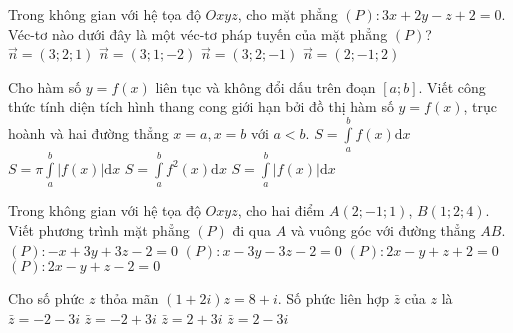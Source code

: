 \begin{ex}%
Trong không gian với hệ tọa độ $Oxyz$, cho mặt phẳng $(P)\colon 3x+2y-z+2=0$. Véc-tơ nào dưới đây là một véc-tơ pháp tuyến của mặt phẳng $(P)$?
\choice
{$\vec{n}=(3;2;1)$}
{$\vec{n}=(3;1;-2)$}
{\True $\vec{n}=(3;2;-1)$}
{$\vec{n}=(2;-1;2)$}
\end{ex}

\begin{ex}%
Cho hàm số $y=f(x)$ liên tục và không đổi dấu trên đoạn $\left[a; b\right]$. Viết công thức tính diện tích hình thang cong giới hạn bởi đồ thị hàm số $y=f(x)$, trục hoành và hai đường thẳng $x=a, x=b$ với $a<b$.
\choice
{$S=\displaystyle\int\limits_a^bf(x)\mathrm{d}x$}
{$S=\pi\displaystyle\int\limits_a^b\left|f(x)\right|\mathrm{d}x$}
{$S=\displaystyle\int\limits_a^bf^2(x)\mathrm{d}x$}
{\True $S=\displaystyle\int\limits_a^b\left|f(x)\right|\mathrm{d}x$}
\end{ex}

\begin{ex}%
Trong không gian với hệ tọa độ $Oxyz$, cho hai điểm $A(2;-1;1)$, $B(1;2;4)$. Viết phương trình mặt phẳng $(P)$ đi qua $A$ và vuông góc với đường thẳng $AB$.
\choice
{$(P)\colon -x+3y+3z-2=0$}
{\True $(P)\colon x-3y-3z-2=0$}
{$(P)\colon 2x-y+z+2=0$}
{$(P)\colon 2x-y+z-2=0$}
\end{ex}

\begin{ex}%
Cho số phức $z$ thỏa mãn $(1+2i)z=8+i$. Số phức liên hợp $\bar{z}$ của $z$ là
\choice
{$\bar{z}=-2-3i$}
{$\bar{z}=-2+3i$}
{\True $\bar{z}=2+3i$}
{$\bar{z}=2-3i$}
\end{ex}

